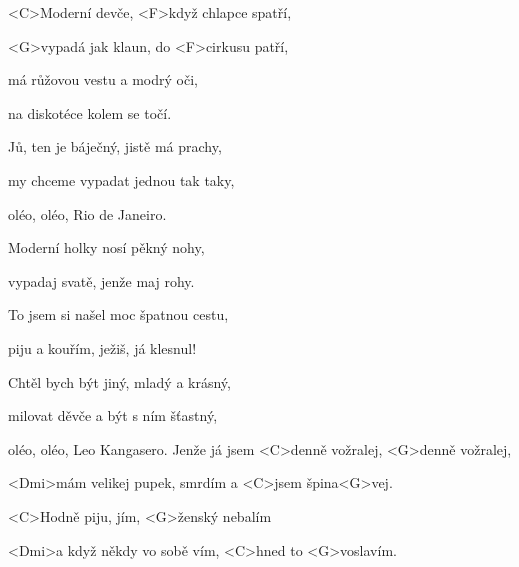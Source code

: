 
\zs
<C>Moderní devče, <F>když chlapce spatří,

<G>vypadá jak klaun, do <F>cirkusu patří,

má růžovou vestu a modrý oči,

na diskotéce kolem se točí.

Jů, ten je báječný, jistě má prachy,

my chceme vypadat jednou tak taky,

oléo, oléo, Rio de Janeiro.
\ks

\zs
Moderní holky nosí pěkný nohy,

vypadaj svatě, jenže maj rohy.

To jsem si našel moc špatnou cestu,

piju a kouřím, ježiš, já klesnul!

Chtěl bych být jiný, mladý a krásný,

milovat děvče a být s ním šťastný,

oléo, oléo, Leo Kangasero.
\ks
\zr
Jenže já jsem <C>denně vožralej, <G>denně vožralej,

<Dmi>mám velikej pupek, smrdím a <C>jsem špina<G>vej.

<C>Hodně piju, jím, <G>ženský nebalím

<Dmi>a když někdy vo sobě vím, <C>hned to <G>voslavím.
\kr

\zr\kr
\kp
